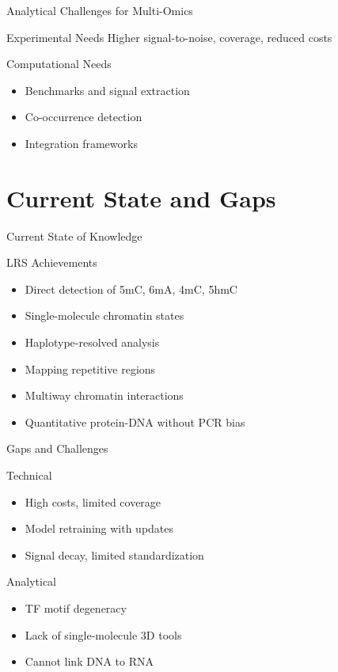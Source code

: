 \documentclass[aspectratio=169]{beamer}
\begin{document}
\begin{frame}{Analytical Challenges for Multi-Omics}
  \begin{block}{Experimental Needs}
    Higher signal-to-noise, coverage, reduced costs
  \end{block}

  \begin{block}{Computational Needs}
    \begin{itemize}
      \item Benchmarks and signal extraction
      \item Co-occurrence detection
      \item Integration frameworks
    \end{itemize}
  \end{block}
\end{frame}

\section{Current State and Gaps}

\begin{frame}{Current State of Knowledge}
  \begin{block}{LRS Achievements}
    \begin{itemize}
      \item Direct detection of 5mC, 6mA, 4mC, 5hmC
      \item Single-molecule chromatin states
      \item Haplotype-resolved analysis
      \item Mapping repetitive regions
      \item Multiway chromatin interactions
      \item Quantitative protein-DNA without PCR bias
    \end{itemize}
  \end{block}
\end{frame}

\begin{frame}{Gaps and Challenges}
  \begin{alertblock}{Technical}
    \begin{itemize}
      \item High costs, limited coverage
      \item Model retraining with updates
      \item Signal decay, limited standardization
    \end{itemize}
  \end{alertblock}

  \begin{alertblock}{Analytical}
    \begin{itemize}
      \item TF motif degeneracy
      \item Lack of single-molecule 3D tools
      \item Cannot link DNA to RNA
    \end{itemize}
  \end{alertblock}
\end{frame}
\end{document}
